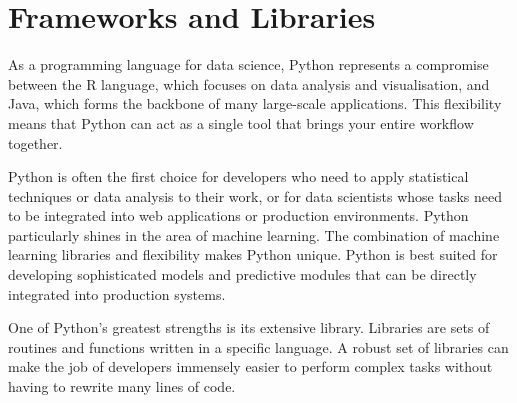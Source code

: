 %
%




\chapter{Frameworks and Libraries}






As a programming language for data science, Python represents a compromise between the R language, which focuses on data analysis and visualisation, and Java, which forms the backbone of many large-scale applications. This flexibility means that Python can act as a single tool that brings your entire workflow together.

Python is often the first choice for developers who need to apply statistical techniques or data analysis to their work, or for data scientists whose tasks need to be integrated into web applications or production environments. Python particularly shines in the area of machine learning. The combination of machine learning libraries and flexibility makes Python unique. Python is best suited for developing sophisticated models and predictive modules that can be directly integrated into production systems.

One of Python's greatest strengths is its extensive library. Libraries are sets of routines and functions written in a specific language. A robust set of libraries can make the job of developers immensely easier to perform complex tasks without having to rewrite many lines of code. 



